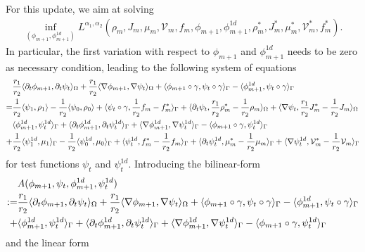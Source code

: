 \documentclass{article}
\DeclarePairedDelimiter{\skp}{\langle}{\rangle}
\begin{document}
\noindent For this update, we aim at solving
\begin{align*}
    \inf\limits_{(\phi_{m+1}, \phi^{1d}_{m+1})} L^{\alpha_1, \alpha_2}(\rho_m, J_m, \mu_m, \mathcal{V}_m, f_m, \phi_{m+1}, \phi^{1d}_{m+1}, \rho^*_m, J^*_m, \mu^*_m, \mathcal{V}^*_m, f^*_m).
\end{align*}
In particular, the first variation with respect to $\phi_{m+1}$ and $\phi^{1d}_{m+1}$ needs to be zero as necessary condition, leading to the following system of equations
\begin{align*}
    &\frac{r_1}{r_2}\skp{\partial_t\phi_{m+1}, \partial_t\psi_t}_\Omega + \frac{r_1}{r_2}\skp{\nabla\phi_{m+1}, \nabla\psi_t}_\Omega + \skp{\phi_{m+1}\circ\gamma, \psi_{t}\circ\gamma}_\Gamma - \skp{\phi^{1d}_{m+1}, \psi_{t}\circ\gamma}_\Gamma\\
    =& \frac{1}{r_2}\skp{\psi_1,\rho_1} - \frac{1}{r_2}\skp{\psi_0, \rho_0} + \skp{\psi_t\circ\gamma, \frac{1}{r_2}f_m -f^*_m}_\Gamma + \skp{\partial_t\psi_t, \frac{r_1}{r_2}\rho^*_m - \frac{1}{r_2}\rho_m}_\Omega + \skp{\nabla\psi_t, \frac{r_1}{r_2} J^*_m-\frac{1}{r_2}J_m}_\Omega \\
    &\skp{\phi^{1d}_{m+1}, \psi_t^{1d}}_\Gamma + \skp{\partial_t\phi^{1d}_{m+1}, \partial_t\psi_t^{1d}}_\Gamma + \skp{\nabla\phi^{1d}_{m+1}, \nabla\psi_t^{1d}}_\Gamma - \skp{\phi_{m+1}\circ\gamma, \psi_t^{1d}}_\Gamma \\
    +& \frac{1}{r_2}\skp{\psi^{1d}_1, \mu_1}_\Gamma - \frac{1}{r_2}\skp{\psi^{1d}_0, \mu_0}_\Gamma + \skp{\psi^{1d}_t, f^*_m - \frac{1}{r_2}f_m}_\Gamma + \skp{\partial_t\psi^{1d}_t, \mu^*_m - \frac{1}{r_2}\mu_m}_\Gamma + \skp{\nabla\psi_t^{1d}, \mathcal{V}^*_m - \frac{1}{r_2}{\mathcal{V}_m}}_\Gamma
\end{align*}
for test functions $\psi_t$ and $\psi_t^{1d}$.
Introducing the bilinear-form 
\begin{align*}
    &A(\phi_{m+1}, \psi_t, \phi^{1d}_{m+1}, \psi^{1d}_t) \\
    :=& \frac{r_1}{r_2}\skp{\partial_t\phi_{m+1}, \partial_t\psi_t}_\Omega + \frac{r_1}{r_2}\skp{\nabla\phi_{m+1}, \nabla\psi_t}_\Omega + \skp{\phi_{m+1}\circ\gamma, \psi_t\circ\gamma}_\Gamma - \skp{\phi^{1d}_{m+1}, \psi_t\circ\gamma}_\Gamma\\
    +& \skp{\phi^{1d}_{m+1}, \psi_t^{1d}}_\Gamma + \skp{\partial_t\phi^{1d}_{m+1}, \partial_t\psi_t^{1d}}_\Gamma + \skp{\nabla\phi^{1d}_{m+1}, \nabla\psi_t^{1d}}_\Gamma - \skp{\phi_{m+1}\circ\gamma, \psi_t^{1d}}_\Gamma 
\end{align*}
and the linear form
\end{document}
